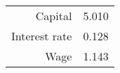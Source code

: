 \begin{center}
\begin{tabular}{r c}
\hline Capital  & 5.010 \\ 
Interest rate & 0.128 \\ 
Wage & 1.143 \\ \hline
\end{tabular}
\end{center}